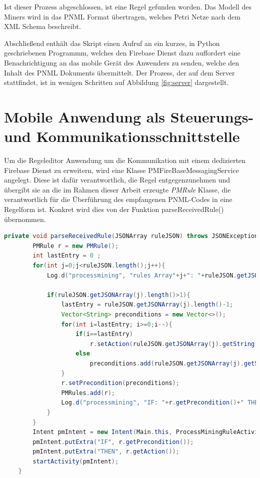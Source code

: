 Ist dieser Prozess abgeschlossen, ist eine Regel gefunden worden.
Das Modell des Miners wird in das PNML Format übertragen, welches Petri Netze nach dem XML Schema beschreibt.

Abschließend enthält das Skript einen Aufruf an ein kurzes, in Python geschriebenen Programmm, welches den Firebase Dienst dazu auffordert eine Benachrichtigung an das mobile Gerät des Anwenders zu senden, welche den Inhalt des PNML Dokuments übermittelt. Der Prozess, der auf dem Server stattfindet, ist in wenigen Schritten auf Abbildung  \ref{fig:server} dargestellt.

\section{Mobile Anwendung als Steuerungs- und Kommunikationsschnittstelle}

Um die Regeleditor Anwendung um die Kommunikation mit einem dedizierten Firebase Dienst zu erweitern, wird eine Klasse PMFireBaseMessagingService angelegt. Diese ist dafür verantwortlich, die Regel entgegenzunehmen und übergibt sie an die im Rahmen dieser Arbeit erzeugte \textit{PMRule} Klasse, die verantwortlich für die Überführung des empfangenen PNML-Codes in eine Regelform ist. Konkret wird dies von der Funktion parseReceivedRule() übernommen.
\small
\begin{lstlisting}[language=Java]
       private void parseReceivedRule(JSONArray ruleJSON) throws JSONException {
        PMRule r = new PMRule();
        int lastEntry = 0 ;
        for(int j=0;j<ruleJSON.length();j++){
            Log.d("processmining", "rules Array"+j+": "+ruleJSON.getJSONArray(j));

            if(ruleJSON.getJSONArray(j).length()>1){
                lastEntry = ruleJSON.getJSONArray(j).length()-1;
                Vector<String> preconditions = new Vector<>();
                for(int i=lastEntry; i>=0;i--){
                    if(i==lastEntry)
                        r.setAction(ruleJSON.getJSONArray(j).getString(i));
                    else
                        preconditions.add(ruleJSON.getJSONArray(j).getString(i));
                }
                r.setPrecondition(preconditions);
                PMRules.add(r);
                Log.d("processmining", "IF: "+r.getPrecondition()+" THEN: "+r.getAction());
            }
        }
        Intent pmIntent = new Intent(Main.this, ProcessMiningRuleActivity.class);
        pmIntent.putExtra("IF", r.getPrecondition());
        pmIntent.putExtra("THEN", r.getAction());
        startActivity(pmIntent);
    }
\end{lstlisting}

